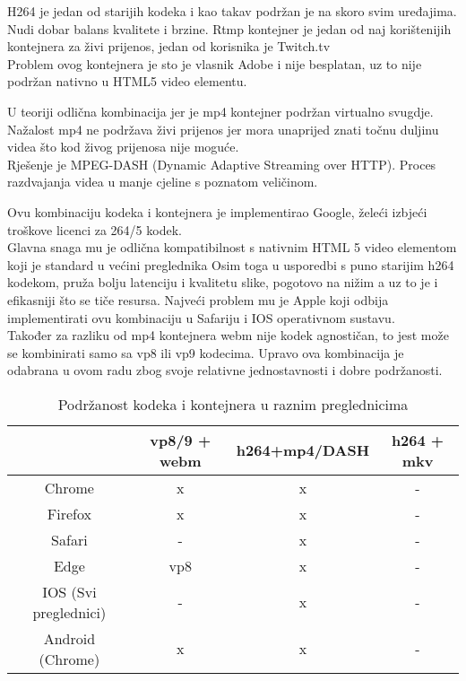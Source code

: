 H264 je jedan od starijih kodeka i kao takav podržan je na skoro svim uređajima.
Nudi dobar balans kvalitete i brzine. \cite{h264Book}
\paraBreak
Rtmp kontejner je jedan od naj korištenijih kontejnera za živi prijenos, jedan od korisnika je Twitch.tv \\
Problem ovog kontejnera je sto je vlasnik Adobe i nije besplatan, uz to nije podržan nativno u HTML5 video elementu.

U teoriji odlična kombinacija jer je mp4 kontejner podržan virtualno svugdje.
\paraBreak
Nažalost mp4 ne podržava živi prijenos jer mora unaprijed znati točnu duljinu videa što kod živog prijenosa nije moguće. \\
Rješenje je MPEG-DASH (Dynamic Adaptive Streaming over HTTP). Proces razdvajanja videa u manje cjeline s poznatom veličinom.

Ovu kombinaciju kodeka i kontejnera je implementirao Google, želeći izbjeći troškove licenci za 264/5 kodek. \\
Glavna snaga mu je odlična kompatibilnost s nativnim HTML 5 video elementom koji je standard u većini preglednika \cite{ffmpegBook}
\paraBreak
Osim toga u usporedbi s puno starijim h264 kodekom, pruža bolju latenciju i kvalitetu slike, pogotovo 
na nižim \hyperref[sct:bitRate]{} a uz to je i efikasniji što se tiče resursa. \cite{ffmpegBook}
\paraBreak
Najveći problem mu je Apple koji odbija implementirati ovu kombinaciju u Safariju i IOS operativnom sustavu. \\
Također za razliku od mp4 kontejnera webm nije kodek agnostičan, to jest može se kombinirati samo sa vp8 ili vp9 kodecima. \cite{ffmpegBook}
\paraBreak
Upravo ova kombinacija je odabrana u ovom radu zbog svoje relativne jednostavnosti i dobre podržanosti.

\begin{center}
  \begin{table}[h]
    \begin{tabular}{|c|c|c|c|}
      \hline
      & vp8/9 + webm & h264+mp4/DASH & h264 + mkv \\
      \hline
      Chrome & x & x & - \\
      Firefox & x & x & - \\
      Safari & - & x & - \\
      Edge & vp8 & x & - \\
      IOS (Svi preglednici) & - & x & - \\
      Android (Chrome) & x & x & - \\
      \hline
    \end{tabular}
    \caption[Podržanost kodeka i kontejnera u raznim preglednicima]
    {Podržanost kodeka i kontejnera u raznim preglednicima \cite{appleCodec} \cite{androidCodec} \cite{canIUse}}
\end{table}

\end{center}
